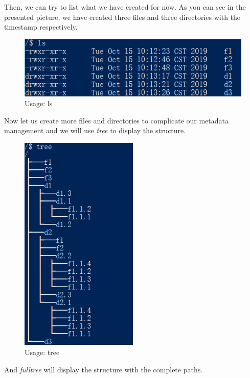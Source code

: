 \documentclass[10pt]{article}
\begin{document}
Then, we can try to list what we have created for now. As you can see in the presented picture, we have created three files and 
three directories with the timestamp respectively.

\begin{figure}[H]
\centerline{\includegraphics[width = 1\textwidth]{images//2 list.png}}
\caption{Usage: ls}
\end{figure}

Now let us create more files and directories to complicate our metadata management and 
we will use \textit{tree} to display the structure.

\begin{figure}[H]
\centerline{\includegraphics[width = 0.5\textwidth]{images//4 tree.png}}
\caption{Usage: tree}
\end{figure}

And \textit{fulltree} will display the structure with the complete paths.
\end{document}
